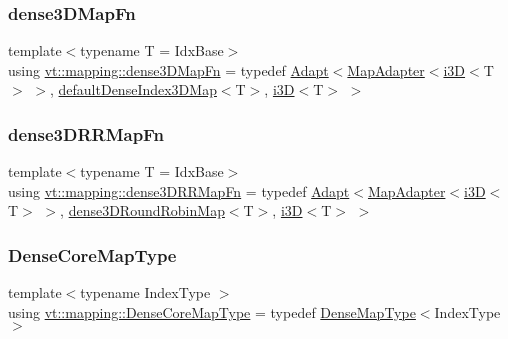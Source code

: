\subsubsection{\texorpdfstring{dense3\+D\+Map\+Fn}{dense3DMapFn}}
{\footnotesize\ttfamily template$<$typename T  = Idx\+Base$>$ \\
using \hyperlink{namespacevt_1_1mapping_a4161eb1a3c61249a269654c4529788e0}{vt\+::mapping\+::dense3\+D\+Map\+Fn} = typedef \hyperlink{namespacevt_1_1mapping_aafe187035ce8df02f31983e37cdb6a5d}{Adapt}$<$\hyperlink{namespacevt_1_1mapping_a41b113c28bb6430fbcb5be66e08ccf9f}{Map\+Adapter}$<$\hyperlink{namespacevt_1_1mapping_af435b967b9ed1ccb5ec4effdbd9abd13}{i3D}$<$T$>$ $>$, \hyperlink{namespacevt_1_1mapping_a776a69138a1fbceab5bbf10b9c07a858}{default\+Dense\+Index3\+D\+Map}$<$T$>$, \hyperlink{namespacevt_1_1mapping_af435b967b9ed1ccb5ec4effdbd9abd13}{i3D}$<$T$>$ $>$}

\mbox{\label{namespacevt_1_1mapping_adb1f9b4ca3e67e3b47ca1a562f656217}} 
\subsubsection{\texorpdfstring{dense3\+D\+R\+R\+Map\+Fn}{dense3DRRMapFn}}
{\footnotesize\ttfamily template$<$typename T  = Idx\+Base$>$ \\
using \hyperlink{namespacevt_1_1mapping_adb1f9b4ca3e67e3b47ca1a562f656217}{vt\+::mapping\+::dense3\+D\+R\+R\+Map\+Fn} = typedef \hyperlink{namespacevt_1_1mapping_aafe187035ce8df02f31983e37cdb6a5d}{Adapt}$<$\hyperlink{namespacevt_1_1mapping_a41b113c28bb6430fbcb5be66e08ccf9f}{Map\+Adapter}$<$\hyperlink{namespacevt_1_1mapping_af435b967b9ed1ccb5ec4effdbd9abd13}{i3D}$<$T$>$ $>$, \hyperlink{namespacevt_1_1mapping_aa48fa3b830b637787c584dbac5bba6db}{dense3\+D\+Round\+Robin\+Map}$<$T$>$, \hyperlink{namespacevt_1_1mapping_af435b967b9ed1ccb5ec4effdbd9abd13}{i3D}$<$T$>$ $>$}

\mbox{\label{namespacevt_1_1mapping_ac198c707792d29c7e3106fb89c3f3f92}} 
\subsubsection{\texorpdfstring{Dense\+Core\+Map\+Type}{DenseCoreMapType}}
{\footnotesize\ttfamily template$<$typename Index\+Type $>$ \\
using \hyperlink{namespacevt_1_1mapping_ac198c707792d29c7e3106fb89c3f3f92}{vt\+::mapping\+::\+Dense\+Core\+Map\+Type} = typedef \hyperlink{namespacevt_1_1mapping_a64f0fc107b569bb6644f1b015c6e7ad8}{Dense\+Map\+Type}$<$Index\+Type$>$}

